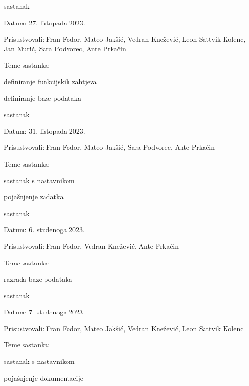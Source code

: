 \begin{packed_enum}
			\item  sastanak
			\item[] \begin{packed_item}
				\item Datum: {27. listopada 2023.}
				\item Prisustvovali: {Fran Fodor, Mateo Jakšić, Vedran Knežević, Leon Sattvik Kolenc, Jan Murić, Sara Podvorec, Ante Prkačin}
				\item Teme sastanka:
				\begin{packed_item}
					\item  definiranje funkcijskih zahtjeva
					\item  definiranje baze podataka
				\end{packed_item}
			\end{packed_item}

			\item  sastanak
			\item[] \begin{packed_item}
				\item Datum: {31. listopada 2023.}
				\item Prisustvovali: {Fran Fodor, Mateo Jakšić, Sara Podvorec, Ante Prkačin}
				\item Teme sastanka:
				\begin{packed_item}
					\item  sastanak s nastavnikom
					\item  pojašnjenje zadatka
				\end{packed_item}
			\end{packed_item}

			\item  sastanak
			\item[] \begin{packed_item}
				\item Datum: {6. studenoga 2023.}
				\item Prisustvovali: {Fran Fodor, Vedran Knežević, Ante Prkačin}
				\item Teme sastanka:
				\begin{packed_item}
					\item  razrada baze podataka
				\end{packed_item}
			\end{packed_item}

			\item  sastanak
			\item[] \begin{packed_item}
				\item Datum: {7. studenoga 2023.}
				\item Prisustvovali: {Fran Fodor, Mateo Jakšić, Vedran Knežević, Leon Sattvik Kolenc}
				\item Teme sastanka:
				\begin{packed_item}
					\item  sastanak s nastavnikom
					\item  pojašnjenje dokumentacije
				\end{packed_item}
			\end{packed_item}


\end{packed_enum}
